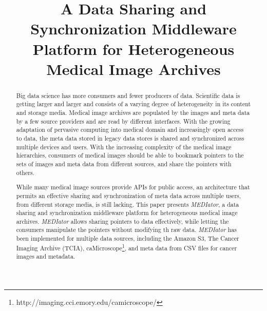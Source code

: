 \documentclass[conference]{IEEEtran}
\begin{document}
\title{A Data Sharing and Synchronization Middleware Platform for Heterogeneous Medical Image Archives\vspace{-33pt}}

\author{
\and
{}
}
\maketitle

\begin{abstract}
Big data science has more consumers and fewer producers of data. Scientific data is getting larger and larger and consists of a varying degree of heterogeneity in its content and storage media. Medical image archives are populated by the images and meta data by a few source providers and are read by different interfaces. With the growing adaptation of pervasive computing into medical domain and increasingly open access to data, the meta data stored in legacy data stores is shared and synchronized across multiple devices and users. With the increasing complexity of the medical image hierarchies, consumers of medical images should be able to bookmark pointers to the sets of images and meta data from different sources, and share the pointers with others. 

While many medical image sources provide APIs for public access, an architecture that permits an effective sharing and synchronization of meta data across multiple users, from different storage media, is still lacking. This paper presents \textit{MEDIator}, a data sharing and synchronization middleware platform for heterogeneous medical image archives. \textit{MEDIator} allows sharing pointers to data effectively, while letting the consumers manipulate the pointers without modifying th raw data. \textit{MEDIator} has been implemented for multiple data sources, including the Amazon S3, The Cancer Imaging Archive (TCIA), caMicroscope\footnote{http://imaging.cci.emory.edu/camicroscope/}, and meta data from CSV files for cancer images and metadata.
\end{abstract}
\end{document}
